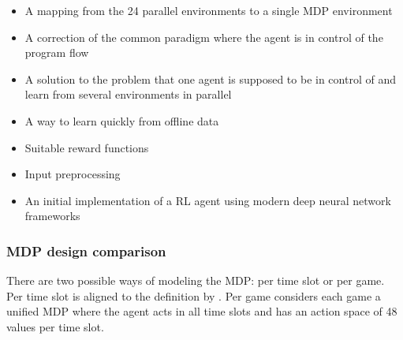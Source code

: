\begin{itemize}
    \itemsep0em
    \item A mapping from the 24 parallel environments to a single \ac{MDP} environment
    \item A correction of the common paradigm where the agent is in control of the program flow
    \item A solution to the problem that one agent is supposed to be in control of and learn from several
        environments in parallel
    \item A way to learn quickly from offline data
    \item Suitable reward functions
    \item Input preprocessing
    \item An initial implementation of a \ac{RL} agent using modern deep neural network frameworks
\end{itemize}


\subsubsection{\acs{MDP} design comparison}%
\label{ssub:mdp_design_comparison}

There are two possible ways of modeling the \ac{MDP}: per time slot or per game. Per time slot is aligned to the
definition by \citet{tactexurieli2016mdp}. Per game considers each game a unified \ac{MDP} where the agent acts in all
time slots and has an action space of 48 values per time slot.


